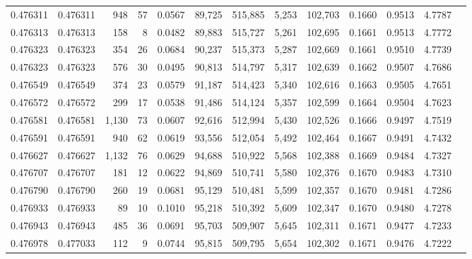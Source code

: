 \begin{tabular}{rrrrrrrrrrrrr}
0.476311 & 0.476311 &   948 &    57 &                                     0.0567 &  89,725 & 515,885 &   5,253 & 102,703 & 0.1660 & 0.9513 & 4.7787 \\
0.476313 & 0.476313 &   158 &     8 &                                     0.0482 &  89,883 & 515,727 &   5,261 & 102,695 & 0.1661 & 0.9513 & 4.7772 \\
0.476323 & 0.476323 &   354 &    26 &                                     0.0684 &  90,237 & 515,373 &   5,287 & 102,669 & 0.1661 & 0.9510 & 4.7739 \\
0.476323 & 0.476323 &   576 &    30 &                                     0.0495 &  90,813 & 514,797 &   5,317 & 102,639 & 0.1662 & 0.9507 & 4.7686 \\
0.476549 & 0.476549 &   374 &    23 &                                     0.0579 &  91,187 & 514,423 &   5,340 & 102,616 & 0.1663 & 0.9505 & 4.7651 \\
0.476572 & 0.476572 &   299 &    17 &                                     0.0538 &  91,486 & 514,124 &   5,357 & 102,599 & 0.1664 & 0.9504 & 4.7623 \\
0.476581 & 0.476581 & 1,130 &    73 &                                     0.0607 &  92,616 & 512,994 &   5,430 & 102,526 & 0.1666 & 0.9497 & 4.7519 \\
0.476591 & 0.476591 &   940 &    62 &                                     0.0619 &  93,556 & 512,054 &   5,492 & 102,464 & 0.1667 & 0.9491 & 4.7432 \\
0.476627 & 0.476627 & 1,132 &    76 &                                     0.0629 &  94,688 & 510,922 &   5,568 & 102,388 & 0.1669 & 0.9484 & 4.7327 \\
0.476707 & 0.476707 &   181 &    12 &                                     0.0622 &  94,869 & 510,741 &   5,580 & 102,376 & 0.1670 & 0.9483 & 4.7310 \\
0.476790 & 0.476790 &   260 &    19 &                                     0.0681 &  95,129 & 510,481 &   5,599 & 102,357 & 0.1670 & 0.9481 & 4.7286 \\
0.476933 & 0.476933 &    89 &    10 &                                     0.1010 &  95,218 & 510,392 &   5,609 & 102,347 & 0.1670 & 0.9480 & 4.7278 \\
0.476943 & 0.476943 &   485 &    36 &                                     0.0691 &  95,703 & 509,907 &   5,645 & 102,311 & 0.1671 & 0.9477 & 4.7233 \\
0.476978 & 0.477033 &   112 &     9 &                                     0.0744 &  95,815 & 509,795 &   5,654 & 102,302 & 0.1671 & 0.9476 & 4.7222 \\

\end{tabular}
